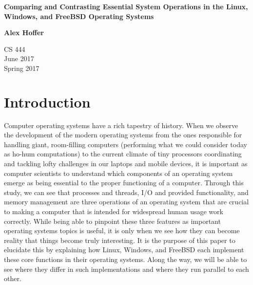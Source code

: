 \documentclass[letterpaper,10pt,titlepage]{article}
\begin{document}
\begin{titlepage}
    \begin{center}
        \vspace*{3.5cm}

        \textbf{Comparing and Contrasting Essential System Operations in the Linux, Windows, and FreeBSD Operating Systems}

        \vspace{0.5cm}

        \textbf{Alex Hoffer}

        \vspace{0.8cm}

        CS 444\\
        June 2017\\
	Spring 2017\\

        \vfill

    \end{center}
\end{titlepage}

\newpage

\tableofcontents

\newpage

\section{Introduction}
Computer operating systems have a rich tapestry of history. When we observe the development of the modern operating systems from the ones responsible for handling giant, room-filling computers (performing what we could consider today as ho-hum computations) to the current climate of tiny processors coordinating and tackling lofty challenges in our laptops and mobile devices, it is important as computer scientists to understand which components of an operating system emerge as being essential to the proper functioning of a computer. Through this study, we can see that processes and threads, I/O and provided functionality, and memory management are three operations of an operating system that are crucial to making a computer that is intended for widespread human usage work correctly. While being able to pinpoint these three features as important operating systems topics is useful, it is only when we see how they can become reality that things become truly interesting. It is the purpose of this paper to elucidate this by explaining how Linux, Windows, and FreeBSD each implement these core functions in their operating systems. Along the way, we will be able to see where they differ in such implementations and where they run parallel to each other.
\end{document}
